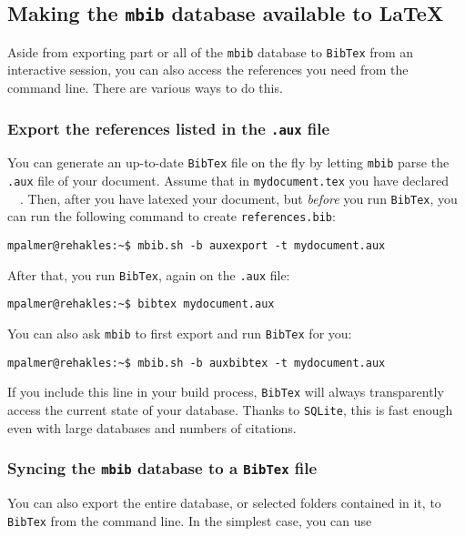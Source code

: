 \documentclass[10pt]{article}
\newcommand*{\mbib}{\texttt{mbib}\xspace}
\newcommand*{\bibtex}{\texttt{BibTex}\xspace}
\newcommand*{\sqlite}{\texttt{SQLite}\xspace}
\begin{document}
\subsection{Making the \mbib database available to \LaTeX{}}

Aside from exporting part or all of the \mbib database to \bibtex from an interactive session, you can also access the references you need from the command line. There are various ways to do this. 

\subsubsection{Export the references listed in the \texttt{.aux} file}

You can generate an up-to-date \bibtex file on the fly by letting \mbib parse the \texttt{.aux} file of your document. Assume that in \texttt{mydocument.tex} you have declared ~~. Then, after you have latexed your document, but \emph{before} you run \bibtex, you can run the following command to create \texttt{references.bib}:

\begin{verbatim}
mpalmer@rehakles:~$ mbib.sh -b auxexport -t mydocument.aux
\end{verbatim}

\noindent After that, you run \bibtex, again on the \texttt{.aux} file:

\begin{verbatim}
mpalmer@rehakles:~$ bibtex mydocument.aux
\end{verbatim}

\noindent You can also ask \mbib to first export and run \bibtex for you:

\begin{verbatim}
mpalmer@rehakles:~$ mbib.sh -b auxbibtex -t mydocument.aux
\end{verbatim}

\noindent If you include this line in your build process, \bibtex will always transparently access the current state of your database. Thanks to \sqlite, this is fast enough even with large databases and numbers of citations. 

\subsubsection{Syncing the \mbib database to a \bibtex file}

You can also export the entire database, or selected folders contained in it, to \bibtex from the command line. In the simplest case, you can use 
\end{document}
